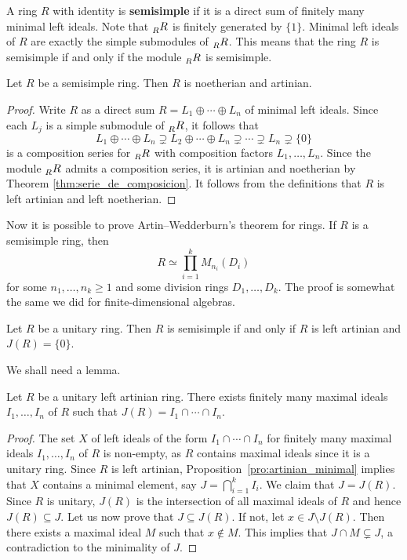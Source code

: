 A ring $R$ with identity is \textbf{semisimple} if it is a direct sum of finitely many minimal left ideals. Note
that $\prescript{}{R}{R}$ is finitely generated by $\{1\}$. Minimal left ideals of $R$ 
are exactly the simple submodules of $\prescript{}{R}{R}$. 
This means that 
the ring $R$ is semisimple if and only if the module
$\prescript{}{R}{R}$ is semisimple.  

\begin{proposition}
    Let $R$ be a semisimple ring. Then $R$ is noetherian and artinian.
\end{proposition}

\begin{proof}
    Write $R$ as a direct sum $R=L_1\oplus\cdots\oplus L_n$ of minimal left ideals. Since 
    each $L_j$ is a simple submodule of $\prescript{}{R}{R}$, it follows that 
    \[
    L_1\oplus\cdots\oplus L_n\supsetneq L_2\oplus\cdots\oplus L_n\supsetneq\cdots\supsetneq L_n\supsetneq\{0\}
    \]
    is a composition series for $\prescript{}{R}{R}$ with composition factors
    $L_1,\dots,L_n$. Since the module $\prescript{}{R}{R}$ admits a composition
    series, it is artinian and noetherian by Theorem \ref{thm:serie_de_composicion}. It follows
    from the definitions that $R$ is left artinian and left noetherian. 
\end{proof}

Now it is possible to prove Artin--Wedderburn's theorem for rings. 
If $R$ is a semisimple ring, then
\[
R\simeq \prod_{i=1}^k M_{n_i}(D_i)
\]
for some $n_1,\dots,n_k\geq1$ and some
division rings $D_1,\dots,D_k$. 
The proof is somewhat
the same we did for finite-dimensional algebras.

\begin{theorem}
	\label{thm:SSartin=J}
	Let $R$ be a unitary ring. Then $R$ is semisimple if and only if 
	$R$ is left artinian and $J(R)=\{0\}$.
\end{theorem}

We shall need a lemma.

\begin{lemma}
	\label{lem:Jartiniano}
	Let $R$ be a unitary left artinian ring. There exists finitely many maximal ideals 
	$I_1,\dots,I_n$ of $R$ such that 
	$J(R)=I_1\cap\cdots\cap I_n$.
\end{lemma}

\begin{proof}
    The set $X$ of left ideals of the form
	$I_1\cap\cdots\cap I_n$ for finitely many maximal ideals $I_1,\dots,I_n$ of $R$
	is non-empty, as $R$ contains maximal ideals since it is a unitary ring. 
    Since $R$ is left artinian,
	Proposition~\ref{pro:artinian_minimal} implies that $X$ 
	contains a minimal element, say 
	$J=\bigcap_{i=1}^k I_i$. We claim that $J=J(R)$. 
	Since $R$ is
	unitary, $J(R)$ is the intersection of all maximal ideals of $R$ and hence 
	$J(R)\subseteq J$. Let us now prove that $J\subseteq J(R)$. 
	If not, let $x\in
	J\setminus J(R)$. Then there exists a maximal ideal $M$ such that $x\not\in
	M$. This implies that $J\cap M\subsetneq J$, a contradiction to the minimality of 
    $J$. 
\end{proof}

